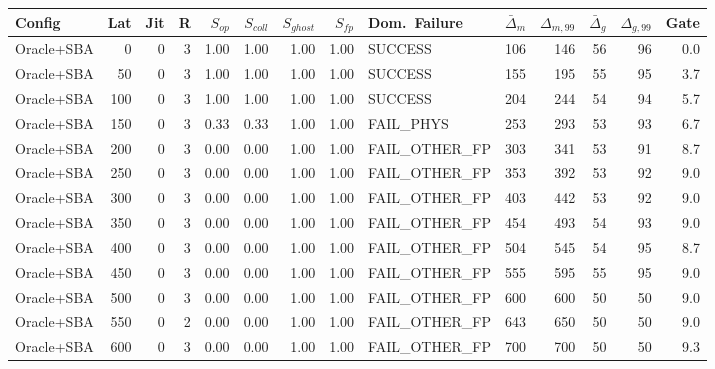 \begin{tabular}{lrrr|rrrr|lrr|rr|r}
  Config & Lat & Jit & R & $S_{op}$ & $S_{coll}$ & $S_{ghost}$ & $S_{fp}$ & Dom.~Failure & $\bar{\Delta}_m$ & $\Delta_{m,99}$ & $\bar{\Delta}_g$ & $\Delta_{g,99}$ & Gate \\
  \hline
  Oracle+SBA                     &    0 &    0 &   3 & 1.00 & 1.00 & 1.00 & 1.00 & SUCCESS         &   106 &   146 &    56 &    96 &   0.0 \\
  Oracle+SBA                     &   50 &    0 &   3 & 1.00 & 1.00 & 1.00 & 1.00 & SUCCESS         &   155 &   195 &    55 &    95 &   3.7 \\
  Oracle+SBA                     &  100 &    0 &   3 & 1.00 & 1.00 & 1.00 & 1.00 & SUCCESS         &   204 &   244 &    54 &    94 &   5.7 \\
  Oracle+SBA                     &  150 &    0 &   3 & 0.33 & 0.33 & 1.00 & 1.00 & FAIL_PHYS       &   253 &   293 &    53 &    93 &   6.7 \\
  Oracle+SBA                     &  200 &    0 &   3 & 0.00 & 0.00 & 1.00 & 1.00 & FAIL_OTHER_FP   &   303 &   341 &    53 &    91 &   8.7 \\
  Oracle+SBA                     &  250 &    0 &   3 & 0.00 & 0.00 & 1.00 & 1.00 & FAIL_OTHER_FP   &   353 &   392 &    53 &    92 &   9.0 \\
  Oracle+SBA                     &  300 &    0 &   3 & 0.00 & 0.00 & 1.00 & 1.00 & FAIL_OTHER_FP   &   403 &   442 &    53 &    92 &   9.0 \\
  Oracle+SBA                     &  350 &    0 &   3 & 0.00 & 0.00 & 1.00 & 1.00 & FAIL_OTHER_FP   &   454 &   493 &    54 &    93 &   9.0 \\
  Oracle+SBA                     &  400 &    0 &   3 & 0.00 & 0.00 & 1.00 & 1.00 & FAIL_OTHER_FP   &   504 &   545 &    54 &    95 &   8.7 \\
  Oracle+SBA                     &  450 &    0 &   3 & 0.00 & 0.00 & 1.00 & 1.00 & FAIL_OTHER_FP   &   555 &   595 &    55 &    95 &   9.0 \\
  Oracle+SBA                     &  500 &    0 &   3 & 0.00 & 0.00 & 1.00 & 1.00 & FAIL_OTHER_FP   &   600 &   600 &    50 &    50 &   9.0 \\
  Oracle+SBA                     &  550 &    0 &   2 & 0.00 & 0.00 & 1.00 & 1.00 & FAIL_OTHER_FP   &   643 &   650 &    50 &    50 &   9.0 \\
  Oracle+SBA                     &  600 &    0 &   3 & 0.00 & 0.00 & 1.00 & 1.00 & FAIL_OTHER_FP   &   700 &   700 &    50 &    50 &   9.3 \\

\end{tabular}
